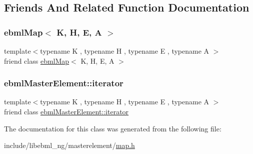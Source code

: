 \subsection{Friends And Related Function Documentation}
\mbox{\label{classebml_1_1ebmlMap_1_1__iterator_a691e480013452ea48661a61746fd1b5c}} 
\subsubsection{\texorpdfstring{ebml\+Map$<$ K, H, E, A $>$}{ebmlMap< K, H, E, A >}}
{\footnotesize\ttfamily template$<$typename K , typename H , typename E , typename A $>$ \\
friend class \mbox{\hyperlink{classebml_1_1ebmlMap}{ebml\+Map}}$<$ K, H, E, A $>$\hspace{0.3cm}{\ttfamily [friend]}}

\mbox{\label{classebml_1_1ebmlMap_1_1__iterator_a7f678a46134f738b99dfff4aafa7fc5f}} 
\subsubsection{\texorpdfstring{ebml\+Master\+Element\+::iterator}{ebmlMasterElement::iterator}}
{\footnotesize\ttfamily template$<$typename K , typename H , typename E , typename A $>$ \\
friend class \mbox{\hyperlink{classebml_1_1ebmlMasterElement_1_1iterator}{ebml\+Master\+Element\+::iterator}}\hspace{0.3cm}{\ttfamily [friend]}}



The documentation for this class was generated from the following file\+:\begin{DoxyCompactItemize}
\item 
include/libebml\+\_\+ng/masterelement/\mbox{\hyperlink{map_8h}{map.\+h}}\end{DoxyCompactItemize}
